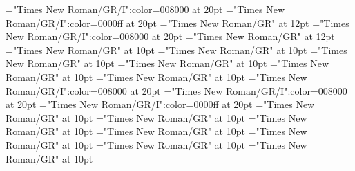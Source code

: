 \documentclass[a4paper]{article}
\begin{document}
\pagestyle{plain}
\sloppy
\setlength{\parfillskip}{0pt plus 1fil}
\font\pronunciationenUSpronunciationarticlebefore="Times New Roman/GR/I":color=008000 at 20pt
\font\pronunciationenUKpronunciationenUSbefore="Times New Roman/GR/I":color=0000ff at 20pt
\font\pronunciationenUSfirstoftypebefore="Times New Roman/GR" at 12pt
\font\pronunciationenUSpronunciationbefore="Times New Roman/GR/I":color=008000 at 20pt
\font\pronunciationenUSbefore="Times New Roman/GR" at 12pt
\font\sectionletterdictionary="Times New Roman/GR" at 10pt
\font\headsectionletterdictionary="Times New Roman/GR" at 10pt
\font\articledictionary="Times New Roman/GR" at 10pt
\font\firstoftypeheadwordlastoftypearticledictionary="Times New Roman/GR" at 10pt
\font\firstoftypegrammarrequireslastoftypearticledictionary="Times New Roman/GR" at 10pt
\font\firstoftypelastoftyperelationsynonymarticledictionary="Times New Roman/GR" at 10pt
\font\firstoftypepronunciationenUKarticledictionary="Times New Roman/GR/I":color=008000 at 20pt
\font\firstoftypepronunciationenUSarticledictionary="Times New Roman/GR/I":color=008000 at 20pt
\font\lastoftypepronunciationenUKarticledictionary="Times New Roman/GR/I":color=0000ff at 20pt
\font\firstoftypegrammarcategorylastoftypearticledictionary="Times New Roman/GR" at 10pt
\font{}="Times New Roman/GR" at 10pt
\font\firstoftypelastoftypenotearticledictionary="Times New Roman/GR" at 10pt
\font\exampleusefirstoftypearticledictionary="Times New Roman/GR" at 10pt
\font\examplefirstoftypearticledictionary="Times New Roman/GR" at 10pt
\font\exampleuselastoftypearticledictionary="Times New Roman/GR" at 10pt
\font\examplelastoftypearticledictionary="Times New Roman/GR" at 10pt

\mbox{} 
\newpage 
\newpage 
\setcounter{page}{1} 
\pagestyle{fancy} 


\end{document}
